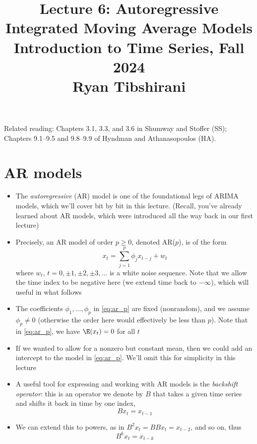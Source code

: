 \documentclass{article}
\title{Lecture 6: Autoregressive Integrated Moving Average Models \\ \smallskip  
\large Introduction to Time Series, Fall 2024 \\ \smallskip
Ryan Tibshirani}
\date{}
\begin{document}
\maketitle
\RaggedRight
\vspace{-50pt}

Related reading: Chapters 3.1, 3.3, and 3.6 in Shumway and Stoffer (SS);
Chapters 9.1--9.5 and 9.8--9.9 of Hyndman and Athanasopoulos (HA).   

\section{AR models}

\begin{itemize}
\item The \emph{autoregressive} (AR) model is one of the foundational legs of
  ARIMA models, which we'll cover bit by bit in this lecture. (Recall, you've
  already learned about AR models, which were introduced all the way back in our 
  first lecture)  

\item Precisely, an AR model of order $p \geq 0$, denoted AR($p$), is of the
  form 
  \begin{equation}
  \label{eq:ar_p}
  x_t = \sum_{j=1}^p \phi_j x_{t-j} + w_t
  \end{equation}
  where $w_t$, $t = 0, \pm 1, \pm 2, \pm 3, \dots$ is a white noise
  sequence. Note that we allow the time index to be negative here (we extend
  time back to $-\infty$), which will useful in what follows 

\item The coefficients $\phi_1,\dots,\phi_p$ in \eqref{eq:ar_p} are fixed
  (nonrandom), and we assume $\phi_p \not= 0$ (otherwise the order here would
  effectively be less than $p$). Note that in \eqref{eq:ar_p}, we have $\E(x_t)
  = 0$ for all $t$

\item If we wanted to allow for a nonzero but constant mean, then we could add
  an intercept to the model in \eqref{eq:ar_p}. We'll omit this for simplicity
  in this lecture  

\item A useful tool for expressing and working with AR models is the
  \emph{backshift operator}: this is an operator we denote by $B$ that takes a 
  given time series and shifts it back in time by one index,
  \[
  B x_t = x_{t-1}
  \]

\item We can extend this to powers, as in $B^2 x_t = B B x_t = x_{t-2}$, and so
  on, thus   
  \[
  B^k x_t = x_{t-k} 
  \]


\end{itemize}
\end{document}
